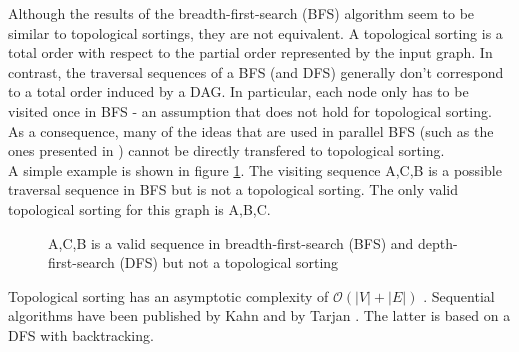 Although the results of the breadth-first-search (BFS) algorithm seem to be similar to topological sortings, they are not equivalent. A topological sorting is a total order with respect to the partial order represented by the input graph. In contrast, the traversal sequences of a BFS (and DFS) generally don’t correspond to a total order induced by a DAG. 
In particular, each node only has to be visited once in BFS - an assumption that does not hold for topological sorting. As a consequence, many of the ideas that are used in parallel BFS (such as the ones presented in \cite{beamer2013direction}) cannot be directly transfered to topological sorting. \\
A simple example is shown in figure \ref{fig:diff-bfs}. The visiting sequence A,C,B is a possible traversal sequence in BFS but is not a topological sorting. The only valid topological sorting for this graph is A,B,C.


\begin{figure}[!hbp]
\centering
 

\caption{A,C,B is a valid sequence in breadth-first-search (BFS) and depth-first-search (DFS) but not a topological sorting}
\label{fig:diff-bfs}
\end{figure}

Topological sorting has an asymptotic complexity of $\mathcal{O}(|V|+|E|)$ \cite[Chapter~22.4]{cormen2001introduction}. Sequential algorithms have been published by Kahn \cite{kahn1962topological} and by Tarjan  \cite{tarjan1976edge}. The latter is based on a DFS with backtracking.

